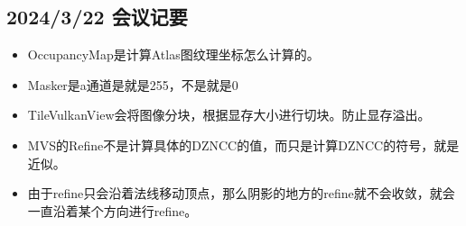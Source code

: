 \subsection{2024/3/22 会议记要}

\begin{itemize}
    \item OccupancyMap是计算Atlas图纹理坐标怎么计算的。
    \item Masker是a通道是就是255，不是就是0
    \item TileVulkanView会将图像分块，根据显存大小进行切块。防止显存溢出。
    \item MVS的Refine不是计算具体的DZNCC的值，而只是计算DZNCC的符号，就是近似。
    \item 由于refine只会沿着法线移动顶点，那么阴影的地方的refine就不会收敛，就会一直沿着某个方向进行refine。
\end{itemize}